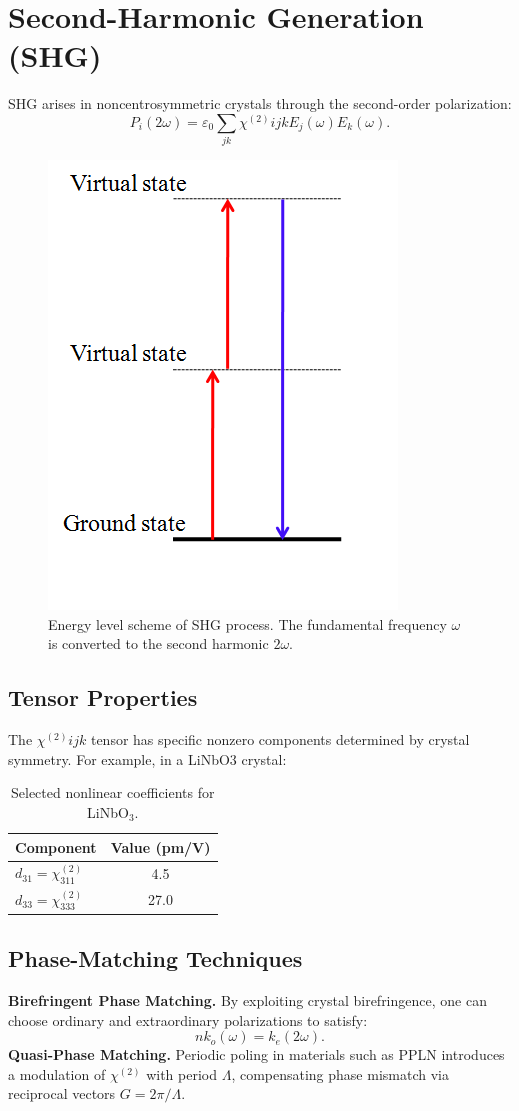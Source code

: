 \documentclass[9pt,a4paper,twocolumn,twoside]{tau-class/tau}
\begin{document}
\section{Second-Harmonic Generation (SHG)}
SHG arises in noncentrosymmetric crystals through the second-order polarization:
\begin{equation}
P_i(2\omega) = \varepsilon_0 \sum_{jk} \chi^{(2)}{ijk} E_j(\omega)E_k(\omega).
\end{equation}

\begin{figure}[!ht] %
\centering
\includegraphics[width=0.35\columnwidth]{figures/Energy_level_scheme_of_SHG.png}
\caption{Energy level scheme of SHG process. \cite{SobarwikiImage} The fundamental frequency $\omega$ is converted to the second harmonic $2\omega$.}
\end{figure}

\subsection{Tensor Properties}
The $\chi^{(2)}{ijk}$ tensor has specific nonzero components determined by crystal symmetry. For example, in a LiNbO$3$ crystal:
\begin{table}[h!]
\centering
\begin{tabular}{l c}
\toprule
Component & Value (pm/V) \\
\midrule
$d_{31} = \chi^{(2)}_{311}$ & 4.5 \\
$d_{33} = \chi^{(2)}_{333}$ & 27.0 \\
\bottomrule
\end{tabular}
\caption{Selected nonlinear coefficients for LiNbO$_3$.}
\end{table}

\subsection{Phase-Matching Techniques}
\textbf{Birefringent Phase Matching.} By exploiting crystal birefringence, one can choose ordinary and extraordinary polarizations to satisfy:
\begin{equation}
n k_o(\omega) = k_e(2\omega).
\end{equation}
\textbf{Quasi-Phase Matching.} Periodic poling in materials such as PPLN introduces a modulation of $\chi^{(2)}$ with period $\Lambda$, compensating phase mismatch via reciprocal vectors $G = 2\pi/\Lambda$.
\end{document}
